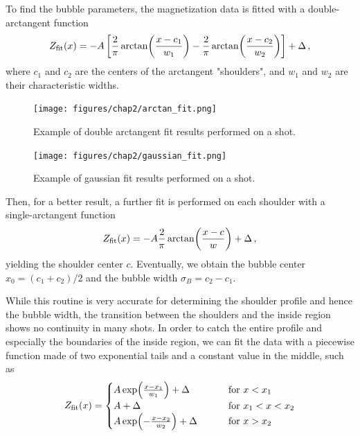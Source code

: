 To find the bubble parameters, the magnetization data is fitted with a double-arctangent function
\begin{equation}
    Z_{\rm fit}(x) = -A \left[\frac{2}{\pi}\arctan(\frac{x-c_1}{w_1}) - \frac{2}{\pi}\arctan(\frac{x-c_2}{w_2})\right] + \Delta\, ,
    \label{eq:double-atan}
\end{equation}
where $c_1$ and $c_2$ are the centers of the arctangent "shoulders", and $w_1$ and $w_2$ are their characteristic widths. 
\begin{figure}[h!]
    \centering
    \begin{minipage}[t]{0.47 \textwidth}
        \centering
        \texttt{[image: figures/chap2/arctan\_fit.png]}
        \caption{Example of double arctangent fit results performed on a shot.}
        \label{fig:atan-fit}
    \end{minipage}
    \hspace{0.02\textwidth}
    \begin{minipage}[t]{0.47 \textwidth}
        \centering
        \texttt{[image: figures/chap2/gaussian\_fit.png]}
        \caption{Example of gaussian fit results performed on a shot.}
        \label{fig:gaussian-fit}
    \end{minipage}
\end{figure}
Then, for a better result, a further fit is performed on each shoulder with a single-arctangent function
\begin{equation*}
    Z_{\rm fit}(x) = -A \frac{2}{\pi}\arctan(\frac{x-c}{w}) + \Delta\, ,
\end{equation*}
yielding the shoulder center $c$. Eventually, we obtain the bubble center $x_0 = (c_1 + c_2)/2$ and the bubble width $\sigma_B = c_2 - c_1$.


While this routine is very accurate for determining the shoulder profile and hence the bubble width, the transition between the shoulders and the inside region shows no continuity in many shots. In order to catch the entire profile and especially the boundaries of the inside region, we can fit the data with a piecewise function made of two exponential tails and a constant value in the middle, such as
\begin{equation*}
    Z_{\rm fit}(x) = 
    \begin{cases}
        A \exp(\frac{x-x_1}{w_1}) + \Delta \qquad\quad &\text{for } x < x_1\\
        A + \Delta \qquad\qquad\qquad\qquad &\text{for } x_1 < x < x_2\\
        A \exp(-\frac{x-x_2}{w_2}) + \Delta \qquad &\text{for } x > x_2
    \end{cases}
\end{equation*}

